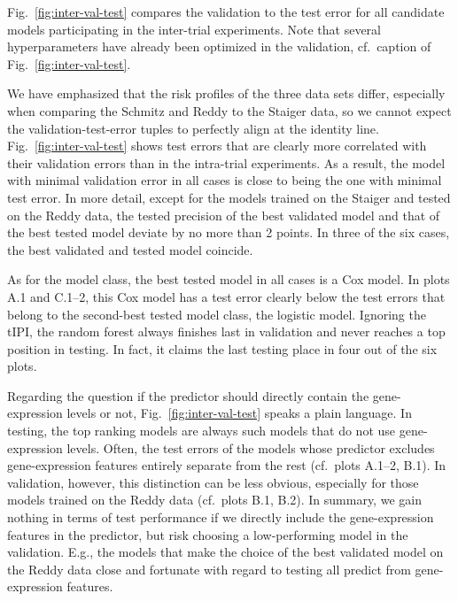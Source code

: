 

Fig.\ \ref{fig:inter-val-test} compares the validation to the test error for all candidate models 
participating in the inter-trial experiments. Note that several hyperparameters have already 
been optimized in the validation, cf.\ caption of Fig.\ \ref{fig:inter-val-test}. 

We have emphasized that the risk profiles of the three data sets differ, especially when comparing 
the Schmitz and Reddy to the Staiger data, so we cannot expect the validation-test-error tuples 
to perfectly align at the identity line. Fig.\ 
\ref{fig:inter-val-test} shows test errors that are clearly more correlated with their validation 
errors than in the intra-trial experiments. As a result, the model with minimal validation error in all 
cases is close to being the one with minimal test error. In more detail, except for
the models trained on the Staiger and tested on the Reddy data, the tested precision of the best 
validated model and that of the best tested model deviate by no more than \num{2} points. In 
three of the six cases, the best validated and tested model coincide. 

As for the model class, the best tested model in all cases is a Cox model. In plots A.1 and C.1--2, 
this Cox model has a test error clearly below the test errors that belong to the second-best tested 
model class, the logistic model. Ignoring the tIPI, the random 
forest always finishes last in validation and never reaches a top position in testing. In fact, 
it claims the last testing place in four out of the six plots.

Regarding the question if the predictor should directly contain the gene-expression levels or not,
Fig.\ \ref{fig:inter-val-test} speaks a plain language. In testing, the top ranking models are 
always such models that do not use gene-expression levels. Often, the test errors of the models whose 
predictor excludes gene-expression features entirely separate from the rest (cf.\ plots A.1--2, B.1). 
In validation, however, this distinction can be less obvious, especially for those models trained on 
the Reddy data (cf.\ plots B.1, B.2). In summary, we gain nothing in terms of test 
performance if we directly include the gene-expression features in the predictor, but risk choosing 
a low-performing model in the validation. E.g., the models that 
make the choice of the best validated model on the Reddy data 
close and fortunate with regard to testing all predict from gene-expression features. 

